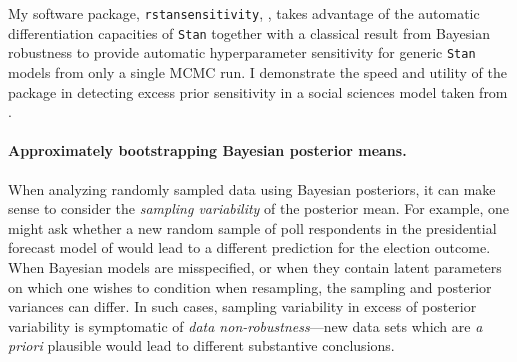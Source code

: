 My software package, \texttt{rstansensitivity},
\citep{giordano:2020:rstansensitivity, giordano:2018:mcmchyper}, takes advantage
of the automatic differentiation capacities of \texttt{Stan}
together with a classical result from  Bayesian
robustness \citep{gustafson:1996:localposterior,
giordano:2018:covariances} to provide automatic hyperparameter sensitivity for
generic \texttt{Stan} models from only a single MCMC run.  I demonstrate the
speed and utility of the package in detecting excess prior sensitivity in a
social sciences model taken from \citet[Chapter 13.5]{gelman:2006:arm}.


\paragraph{Approximately bootstrapping Bayesian posterior means.}
%
When analyzing randomly sampled data using Bayesian posteriors, it can make
sense to consider the \emph{sampling variability} of the posterior mean.  For
example, one might ask whether a new random sample of poll respondents in the
presidential forecast model of \citet{economist:2020:election} would lead to a
different prediction for the election outcome.  When Bayesian models are
misspecified, or when they contain latent parameters on which one wishes to
condition when resampling, the sampling and posterior variances can differ.  In
such cases, sampling variability in excess of posterior variability is
symptomatic of \emph{data non-robustness}---new data sets which are \textit{a
priori} plausible would lead to different substantive conclusions.


